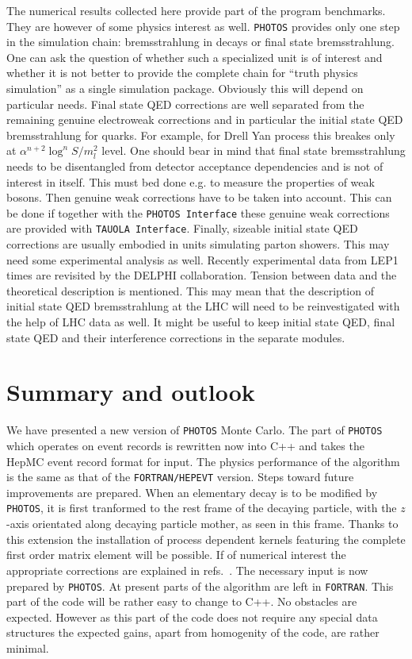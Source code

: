 \documentclass[]{Photos_interface_design}
\begin{document}
The numerical results collected here provide part of the program benchmarks. 
They are however of  some physics interest as well.
 {\tt PHOTOS} provides only one step in the simulation chain: 
bremsstrahlung in decays or final state bremsstrahlung. One can ask 
the question of whether such a specialized unit is of interest and whether it is not better 
to provide the complete chain for ``truth physics simulation'' as a single simulation package. Obviously this will
depend on particular needs. Final state QED corrections are 
well separated from the remaining genuine electroweak corrections and 
in particular the initial state QED bremsstrahlung for quarks. For example, for
Drell Yan process this breakes only at $\alpha^{n+2}\log^{n}{S/m_l^{2}}$ level.
One should bear in mind that final state bremsstrahlung 
needs to be disentangled from detector acceptance dependencies and is not of 
interest in itself. This must bed done e.g. to measure the properties of weak bosons.
Then genuine weak corrections have to be taken into account.
This can be done if together with the {\tt PHOTOS Interface}
these genuine weak corrections are provided with {\tt TAUOLA Interface}.
Finally, sizeable initial state QED corrections are usually embodied in  units 
simulating parton showers. This may need some experimental analysis as well. 
Recently experimental data from LEP1 times are revisited \cite{Abdallah:2010tk} 
by the DELPHI collaboration. Tension between data and the theoretical description is 
mentioned. This may mean that the description of initial state QED bremsstrahlung 
at the LHC will need to be reinvestigated with the help of LHC data as well.
It might be useful to keep initial state QED, final state QED and their interference corrections in the separate modules.

\section{Summary and outlook}
\label{sec:summary}
We have presented a new version  of {\tt PHOTOS} Monte Carlo. The part of 
{\tt PHOTOS} which operates on 
event records is rewritten now into C++ and takes the HepMC event record 
format for input. The physics performance of the algorithm is the same  as that of 
the {\tt FORTRAN/HEPEVT} version. Steps toward future improvements are prepared. 
When an elementary decay is to be modified by {\tt PHOTOS}, it is first tranformed to the rest frame of the
decaying particle, with the $z$-axis orientated along decaying particle mother, as seen in this frame.
Thanks to this extension the installation of process dependent kernels
featuring the complete first order matrix element will be possible.
If of numerical interest the appropriate corrections are explained in
refs.~\cite{Golonka:2006tw,Nanava:2006vv,Nanava:2009vg}. The necessary
input is now prepared by {\tt PHOTOS}.
At present parts of the algorithm are left in {\tt FORTRAN}. This part of the code 
will be rather easy to change to C++. No obstacles are expected. However as this part of the code does not require any special data structures the expected gains,
apart from homogenity of the code, are rather minimal.  
\end{document}
